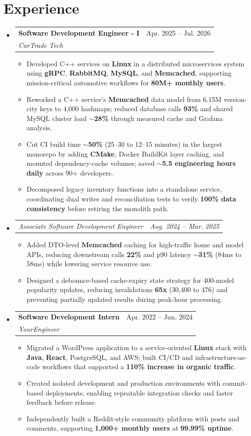 \documentclass[letterpaper,11pt]{article}
\makeatletter
\newcommand{\resumeItem}[1]{
  \item\small{
    {#1 \vspace{-2pt}}
  }
}
\newcommand{\resumeSubheading}[4]{
  \vspace{-2pt}\item
    \begin{tabular*}{0.97\textwidth}[t]{l@{\extracolsep{\fill}}r}
      \textbf{#1} & #2 \\
      \textit{\small#3} & \textit{\small #4} \\
    \end{tabular*}\vspace{-7pt}
}
\newcommand{\resumeSubSubheading}[2]{
    \item
    \begin{tabular*}{0.97\textwidth}{l@{\extracolsep{\fill}}r}
      \textit{\small#1} & \textit{\small #2} \\
    \end{tabular*}\vspace{-7pt}
}
\newcommand{\resumeSubHeadingListStart}{\begin{itemize}[leftmargin=0.15in, label={}]}
\newcommand{\resumeSubHeadingListEnd}{\end{itemize}}
\newcommand{\resumeItemListStart}{\begin{itemize}}
\newcommand{\resumeItemListEnd}{\end{itemize}\vspace{-5pt}}
\makeatother
\begin{document}
\section{Experience}
\resumeSubHeadingListStart
\resumeSubheading
{Software Development Engineer - I}{Apr. 2025 -- Jul. 2026}
{CarTrade Tech}{ }
\resumeItemListStart
\resumeItem{Developed C++ services on \textbf{Linux} in a distributed microservices system using \textbf{gRPC}, \textbf{RabbitMQ}, \textbf{MySQL}, and \textbf{Memcached}, supporting mission-critical automotive workflows for \textbf{80M+ monthly users}.}
\resumeItem{Reworked a C++ service's \textbf{Memcached} data model from 6.15M version-city keys to 4,000 hashmaps; reduced database calls \textbf{93\%} and shared MySQL cluster load \textbf{$\sim$28\%} through measured cache and Grafana analysis.}
\resumeItem{Cut CI build time \textbf{$\sim$50\%} (25--30 to 12--15 minutes) in the largest monorepo by adding \textbf{CMake}, Docker BuildKit layer caching, and mounted dependency-cache volumes; saved \textbf{$\sim$5.5 engineering hours daily} across 90+ developers.}
\resumeItem{Decomposed legacy inventory functions into a standalone service, coordinating dual writes and reconciliation tests to verify \textbf{100\% data consistency} before retiring the monolith path.}
\resumeItemListEnd
\resumeSubSubheading
{Associate Software Development Engineer}{Aug. 2024 -- Mar. 2025}
\resumeItemListStart
\resumeItem{Added DTO-level \textbf{Memcached} caching for high-traffic home and model APIs, reducing downstream calls \textbf{22\%} and p90 latency \textbf{$\sim$31\%} (84ms to 58ms) while lowering service resource use.}
\resumeItem{Designed a debounce-based cache-expiry state strategy for 400-model popularity updates, reducing invalidations \textbf{65x} (30,400 to 476) and preventing partially updated results during peak-hour processing.}
\resumeItemListEnd
\resumeSubheading
{Software Development Intern}{Apr. 2022 -- Jun. 2024}
{YourEngineer}{ }
\resumeItemListStart
\resumeItem{Migrated a WordPress application to a service-oriented \textbf{Linux} stack with \textbf{Java}, \textbf{React}, PostgreSQL, and AWS; built CI/CD and infrastructure-as-code workflows that supported a \textbf{110\% increase in organic traffic}.}
\resumeItem{Created isolated development and production environments with commit-based deployments, enabling repeatable integration checks and faster feedback before release.}
\resumeItem{Independently built a Reddit-style community platform with posts and comments, supporting \textbf{1,000+ monthly users} at \textbf{99.99\% uptime}.}
\resumeItemListEnd
\resumeSubHeadingListEnd
\end{document}

